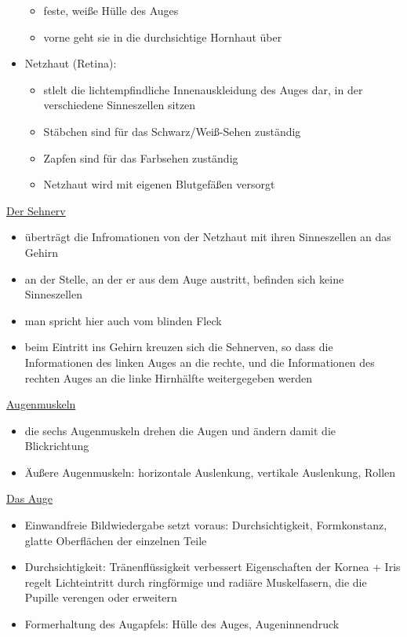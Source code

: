 \documentclass[a4paper,10pt,oneside]{article}
\begin{document}
\begin{itemize}
			\begin{itemize}
				\item feste, weiße Hülle des Auges
				\item vorne geht sie in die durchsichtige Hornhaut über
			\end{itemize}
		\item Netzhaut (Retina):
			\begin{itemize}
				\item stlelt die lichtempfindliche Innenauskleidung des Auges dar, in der verschiedene Sinneszellen sitzen
				\item Stäbchen sind für das Schwarz/Weiß-Sehen zuständig
				\item Zapfen sind für das Farbsehen zuständig
				\item Netzhaut wird mit eigenen Blutgefäßen versorgt
			\end{itemize}
	\end{itemize}
	
\underline{Der Sehnerv} \\
	\begin{itemize}
		\item überträgt die Infromationen von der Netzhaut mit ihren Sinneszellen an das Gehirn
		\item an der Stelle, an der er aus dem Auge austritt, befinden sich keine Sinneszellen
		\item man spricht hier auch vom blinden Fleck
		\item beim Eintritt ins Gehirn kreuzen sich die Sehnerven, so dass die Informationen des linken Auges an die rechte, und die Informationen des rechten Auges an die linke Hirnhälfte weitergegeben werden
	\end{itemize}
	
\underline{Augenmuskeln} \\
	\begin{itemize}
		\item die sechs Augenmuskeln drehen die Augen und ändern damit die Blickrichtung
		\item Äußere Augenmuskeln: horizontale Auslenkung, vertikale Auslenkung, Rollen
	\end{itemize}
	
\underline{Das Auge} \\
	\begin{itemize}
		\item Einwandfreie Bildwiedergabe setzt voraus:	Durchsichtigkeit, Formkonstanz, glatte Oberflächen der einzelnen Teile
		\item Durchsichtigkeit: Tränenflüssigkeit verbessert Eigenschaften der Kornea + Iris regelt Lichteintritt durch ringförmige und radiäre Muskelfasern, die die Pupille verengen oder erweitern
		\item Formerhaltung des Augapfels: Hülle des Auges, Augeninnendruck
	\end{itemize}
\end{document}
